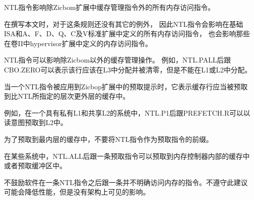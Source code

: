 NTL指令影响除Zicbom扩展中缓存管理指令外的所有内存访问指令。

\begin{commentary}
在撰写本文时，对于这条规则还没有其它的例外，
因此NTL指令会影响在基础ISA和A、F、D、Q、C及V标准扩展中定义的所有内存访问指令，
也会影响那些在卷II中hypervisor扩展中定义的内存访问指令。

NTL指令可以影响除Zicbom以外的缓存管理操作。
例如，NTL.PALL后跟CBO.ZERO可以表示该行应该在L3中分配并被清零，但是不能在L1或L2中分配。
\end{commentary}

当一个NTL指令被应用到Zicbop扩展中的预取提示时，它表示缓存行应当被预取到比NTL所指定的层次更外层的缓存中。

\begin{commentary}
例如，在一个具有私有L1和共享L2的系统中，NTL.P1后跟PREFETCH.R可以以读意图预取到L2中。

为了预取到最内层的缓存中，不要将NTL指令作为预取指令的前缀。

在某些系统中，NTL.ALL后跟一条预取指令可以预取到内存控制器内部的缓存中或者预取缓冲区中。
\end{commentary}

不鼓励软件在一条NTL指令之后跟一条并不明确访问内存的指令。不遵守此建议可能会降低性能，但是没有架构上可见的影响。

